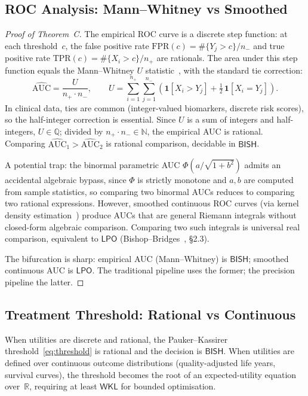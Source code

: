\documentclass[11pt,a4paper]{article}
\theoremstyle{plain}
\theoremstyle{definition}
\newcommand{\BISH}{\textsf{BISH}}
\newcommand{\WKL}{\textsf{WKL}}
\newcommand{\LPO}{\textsf{LPO}}
\newcommand{\Q}{\mathbb{Q}}
\newcommand{\R}{\mathbb{R}}
\newcommand{\N}{\mathbb{N}}
\begin{document}
\subsection{ROC Analysis: Mann--Whitney vs Smoothed}

\begin{proof}[Proof of Theorem~C]
The empirical ROC curve is a discrete step function: at each threshold~$c$, the false positive rate $\mathrm{FPR}(c) = \#\{Y_j > c\}/n_-$ and true positive rate $\mathrm{TPR}(c) = \#\{X_i > c\}/n_+$ are rationals.  The area under this step function equals the Mann--Whitney $U$ statistic~\cite{hanley-mcneil1982}, with the standard tie correction:
\[
  \widehat{\mathrm{AUC}} = \frac{U}{n_+ \cdot n_-}, \qquad U = \sum_{i=1}^{n_+}\sum_{j=1}^{n_-} \left(\mathbf{1}[X_i > Y_j] + \tfrac{1}{2}\,\mathbf{1}[X_i = Y_j]\right).
\]
In clinical data, ties are common (integer-valued biomarkers, discrete risk scores), so the half-integer correction is essential.  Since $U$ is a sum of integers and half-integers, $U \in \Q$; divided by $n_+ \cdot n_- \in \N$, the empirical AUC is rational.  Comparing $\widehat{\mathrm{AUC}}_1 > \widehat{\mathrm{AUC}}_2$ is rational comparison, decidable in $\BISH$.

A potential trap: the binormal parametric AUC $\Phi(a/\sqrt{1+b^2})$ admits an accidental algebraic bypass, since $\Phi$ is strictly monotone and $a, b$ are computed from sample statistics, so comparing two binormal AUCs reduces to comparing two rational expressions.  However, smoothed continuous ROC curves (via kernel density estimation~\cite{pepe2003}) produce AUCs that are general Riemann integrals without closed-form algebraic comparison.  Comparing two such integrals is universal real comparison, equivalent to $\LPO$ (Bishop--Bridges~\cite{bishop-bridges}, \S2.3).

The bifurcation is sharp: empirical AUC (Mann--Whitney) is $\BISH$; smoothed continuous AUC is $\LPO$.  The traditional pipeline uses the former; the precision pipeline the latter.
\end{proof}

\subsection{Treatment Threshold: Rational vs Continuous}

When utilities are discrete and rational, the Pauker--Kassirer threshold~\eqref{eq:threshold} is rational and the decision is $\BISH$.  When utilities are defined over continuous outcome distributions (quality-adjusted life years, survival curves), the threshold becomes the root of an expected-utility equation over~$\R$, requiring at least $\WKL$ for bounded optimisation.
\end{document}
